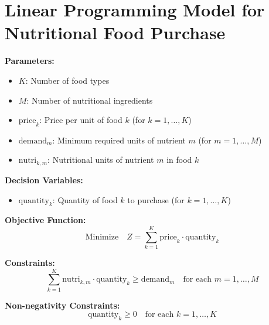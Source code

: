 \documentclass{article}
\begin{document}
\section*{Linear Programming Model for Nutritional Food Purchase}

\textbf{Parameters:}
\begin{itemize}
    \item \( K \): Number of food types
    \item \( M \): Number of nutritional ingredients
    \item \( \text{price}_k \): Price per unit of food \( k \) (for \( k = 1, \ldots, K \))
    \item \( \text{demand}_m \): Minimum required units of nutrient \( m \) (for \( m = 1, \ldots, M \))
    \item \( \text{nutri}_{k,m} \): Nutritional units of nutrient \( m \) in food \( k \)
\end{itemize}

\textbf{Decision Variables:}
\begin{itemize}
    \item \( \text{quantity}_k \): Quantity of food \( k \) to purchase (for \( k = 1, \ldots, K \))
\end{itemize}

\textbf{Objective Function:}
\[
\text{Minimize} \quad Z = \sum_{k=1}^{K} \text{price}_k \cdot \text{quantity}_k
\]

\textbf{Constraints:}
\[
\sum_{k=1}^{K} \text{nutri}_{k,m} \cdot \text{quantity}_k \geq \text{demand}_m \quad \text{for each } m = 1, \ldots, M
\]

\textbf{Non-negativity Constraints:}
\[
\text{quantity}_k \geq 0 \quad \text{for each } k = 1, \ldots, K
\]
\end{document}
